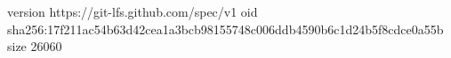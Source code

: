 version https://git-lfs.github.com/spec/v1
oid sha256:17f211ac54b63d42cea1a3bcb98155748c006ddb4590b6c1d24b5f8cdce0a55b
size 26060
